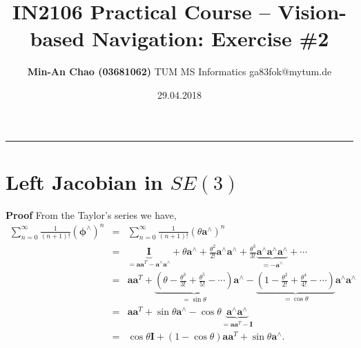 \documentclass[12pt,a4paper]{article}
\makeatletter
\newcommand{\docTitle}{IN2106 Practical Course -- Vision-based Navigation: Exercise \#2}
\newcommand{\docAuthor}{Min-An Chao (03681062)}
\newcommand{\docAuthorDept}{TUM MS Informatics}
\newcommand{\docAuthorEmail}{ga83fok@mytum.de}
\newcommand{\docDate}{29.04.2018}
\newcommand{\vct}[1]{\boldsymbol{#1}}
\newcommand{\mtx}[1]{\mathbf{#1}}
\makeatother
\begin{document}
    \title{\vspace{-1.75cm} \large \textsf{\textbf{\docTitle}}}
    \author{\normalsize \textsf{
        \textbf{\docAuthor} \hspace{6pt}\textbar\hspace{6pt}
        \docAuthorDept \hspace{6pt}\textbar\hspace{6pt}
        \docAuthorEmail}}
    \date{\small \textsf{\docDate}}
    \maketitle 
    \thispagestyle{fancy}
    \vspace{-0.5cm}
    \hrule

    \section{Left Jacobian in $SE(3)$}
   
    \textsf{\textbf{Proof}}
    From the Taylor's series we have,
    \begin{eqnarray}\label{eq:lj_proof}
      \sum_{n=0}^{\infty} \frac{1}{(n+1)!} (\vct{\phi}^{\wedge})^n
      &=& \sum_{n=0}^{\infty} \frac{1}{(n+1)!} (\theta \vct{a}^{\wedge})^n \nonumber\\
      &=& \underbrace{\mtx{I}}_{=\vct{a}\vct{a}^T - \vct{a}^{\wedge}\vct{a}^{\wedge}}
          + \theta \vct{a}^{\wedge} 
          + \frac{\theta^2}{2!}\vct{a}^{\wedge}\vct{a}^{\wedge} 
          + \frac{\theta^3}{3!}\underbrace{
            \vct{a}^{\wedge}\vct{a}^{\wedge}\vct{a}^{\wedge}
            }_{= -\vct{a}^{\wedge}}
          + \cdots \nonumber\\
      &=& \vct{a}\vct{a}^T
          + \underbrace{\left(  
            \theta - \frac{\theta^3}{3!} + \frac{\theta^5}{5!} - \cdots 
            \right)}_{= \sin \theta}
            \vct{a}^{\wedge}
          - \underbrace{\left(  
            1 - \frac{\theta^2}{2!} + \frac{\theta^4}{4!} - \cdots
            \right)  }_{= \cos \theta} 
            \vct{a}^{\wedge}\vct{a}^{\wedge}  \nonumber\\
      &=& \vct{a}\vct{a}^T
          + \sin \theta \vct{a}^{\wedge}
          - \cos \theta \underbrace{
            \vct{a}^{\wedge}\vct{a}^{\wedge}
            }_{ = \vct{a}\vct{a}^T - \mtx{I}}  \nonumber\\
      &=& \cos \theta \mtx{I}
          + (1 - \cos\theta) \vct{a}\vct{a}^T 
          + \sin \theta \vct{a}^{\wedge}.
    \end{eqnarray}
    
\end{document}
